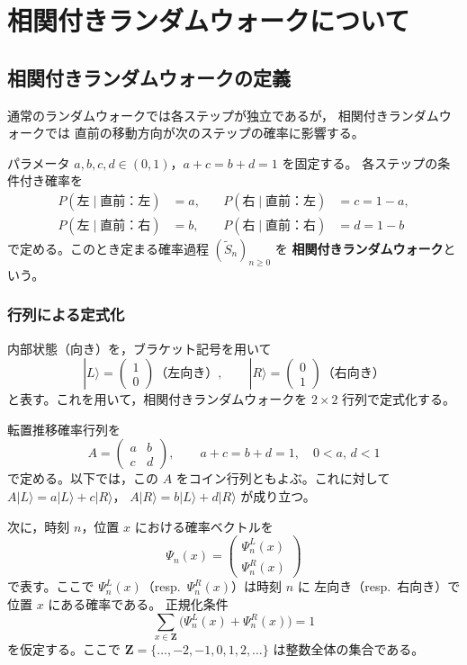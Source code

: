 \documentclass[a4j,dvipdfmx]{jsarticle}
\theoremstyle{plainnote}
\begin{document}
\section{相関付きランダムウォークについて}

\subsection{相関付きランダムウォークの定義}

通常のランダムウォークでは各ステップが独立であるが，
相関付きランダムウォークでは
直前の移動方向が次のステップの確率に影響する。


パラメータ $a, b, c, d \in (0,1)$，$a + c = b + d = 1$ を固定する。
各ステップの条件付き確率を
\begin{align*}
  P(\text{左} \mid \text{直前：左}) &= a, \quad &
  P(\text{右} \mid \text{直前：左}) &= c = 1-a, \\
  P(\text{左} \mid \text{直前：右}) &= b, \quad &
  P(\text{右} \mid \text{直前：右}) &= d = 1-b
\end{align*}
で定める。このとき定まる確率過程 $(\tilde{S}_n)_{n \geq 0}$ を
\textbf{相関付きランダムウォーク}という。

\subsubsection*{行列による定式化}

内部状態（向き）を，ブラケット記号を用いて
\[
  |L\rangle = \begin{pmatrix}1\\0\end{pmatrix} \text{（左向き）}, \qquad
  |R\rangle = \begin{pmatrix}0\\1\end{pmatrix} \text{（右向き）}
\]
と表す。これを用いて，相関付きランダムウォークを $2 \times 2$ 行列で定式化する。

転置推移確率行列を
\[
  A = \begin{pmatrix} a & b \\ c & d \end{pmatrix}, \qquad
  a + c = b + d = 1, \quad 0 < a,\, d < 1
\]
で定める。以下では，この $A$ をコイン行列ともよぶ。これに対して
$A|L\rangle = a|L\rangle + c|R\rangle$，
$A|R\rangle = b|L\rangle + d|R\rangle$
が成り立つ。

次に，時刻 $n$，位置 $x$ における確率ベクトルを
\[
  \Psi_n(x) = \begin{pmatrix} \Psi_n^L(x) \\ \Psi_n^R(x) \end{pmatrix}
\]
で表す。ここで $\Psi_n^L(x)$（resp.\ $\Psi_n^R(x)$）は時刻 $n$ に
左向き（resp.\ 右向き）で位置 $x$ にある確率である。
正規化条件
\[
  \sum_{x \in \mathbf{Z}} \bigl(\Psi_n^L(x) + \Psi_n^R(x)\bigr) = 1
\]
を仮定する。ここで $\mathbf{Z}=\{\ldots,-2,-1,0,1,2,\ldots\}$ は整数全体の集合である。
\end{document}
